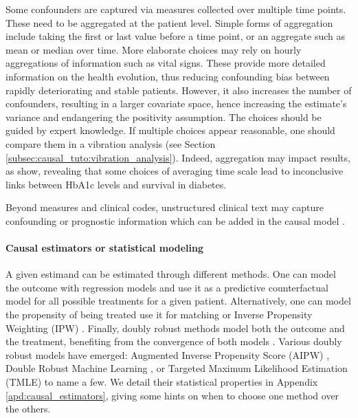 \documentclass[french,12pt,twoside,a4paper]{book}
\begin{document}
Some confounders are captured via measures collected over multiple time points.
These need to be aggregated at the patient level. Simple forms of aggregation
include taking the first or last value before a time point, or an aggregate such
as mean or median over time. More elaborate choices may rely on hourly
aggregations of information such as vital signs. These provide more detailed
information on the health evolution, thus reducing confounding bias between
rapidly deteriorating and stable patients. However, it also increases the number
of confounders, resulting in a larger covariate space, hence increasing the
estimate's variance and endangering the positivity assumption. The choices
should be guided by expert knowledge. If multiple choices appear reasonable, one
should compare them in a vibration analysis (see Section
\ref{subsec:causal_tuto:vibration_analysis}). Indeed, aggregation may impact results, as
\cite{sofrygin2019targeted} show, revealing that some choices of averaging time
scale lead to inconclusive links between HbA1c levels and survival in diabetes.

Beyond measures and clinical codes, unstructured clinical text may capture
confounding or prognostic information \citep{horng2017creating,jiang2023health}
which can be added in the causal model \citep{zeng2022uncovering}.

\paragraph{Causal estimators or statistical modeling}

A given estimand can be estimated through different methods. One can model the
outcome with regression models \citep[also known as
  G-formula,][]{robins_role_1986} and use it as a predictive counterfactual model
for all possible treatments for a given patient. Alternatively, one can model
the propensity of being treated use it for matching or Inverse Propensity
Weighting (IPW) \citep{austin2015moving}. Finally, doubly robust methods model
both the outcome and the treatment, benefiting from the convergence of both
models \citep{wager2020stats}. Various doubly robust models have emerged:
Augmented Inverse Propensity Score (AIPW) \citep{robins1994estimation}, Double
Robust Machine Learning \citep{chernozhukov2018double}, or Targeted Maximum
Likelihood Estimation (TMLE) \citep{schuler2017targeted} to name a few. We
detail their statistical properties in Appendix \ref{apd:causal_estimators},
giving some hints on when to choose one method over the others.
\end{document}
